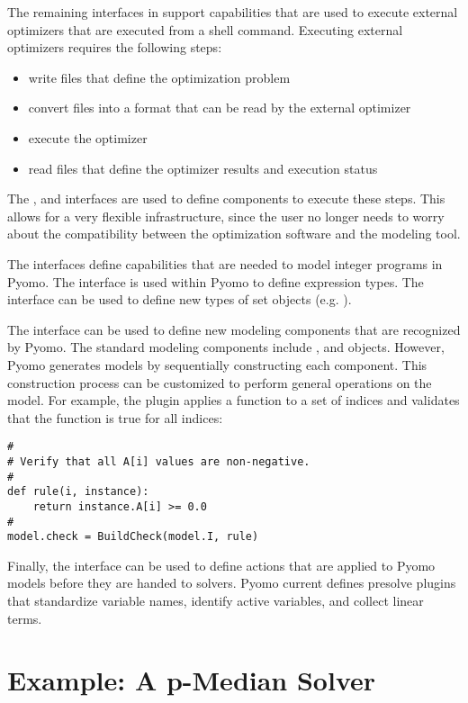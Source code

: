 The remaining interfaces in  support capabilities that
are used to execute external optimizers that are executed from a 
shell command.  Executing external optimizers requires the
following steps:
\begin{itemize}
\item write files that define the optimization problem
\item convert files into a format that can be read by the external optimizer
\item execute the optimizer
\item read files that define the optimizer results and execution status 
\end{itemize}
The ,  and
 interfaces are used to define components to
execute these steps.  This allows for a very flexible infrastructure,
since the user no longer needs to worry about the compatibility between
the optimization software and the modeling tool.

The  interfaces define capabilities that are needed
to model integer programs in Pyomo.  The 
interface is used within Pyomo to define expression types.  The
 interface can be used to define new types of set objects
(e.g. ).  

The  interface can be used to define new modeling
components that are recognized by Pyomo.  The standard modeling components
include ,  and  objects.  However,
Pyomo generates models by sequentially constructing each component.  This 
construction process can be customized to perform general operations on the model.  For example, the  plugin applies a function to a 
set of indices and validates that the function is true for all indices:
\begin{lstlisting}
#
# Verify that all A[i] values are non-negative.
#
def rule(i, instance):
    return instance.A[i] >= 0.0
#
model.check = BuildCheck(model.I, rule) 
\end{lstlisting}

Finally, the  interface can be used to define actions that are applied to Pyomo models before they are handed to solvers. 
Pyomo current defines presolve plugins that standardize variable names,
identify active variables, and collect linear terms.


\section{Example: A p-Median Solver}

